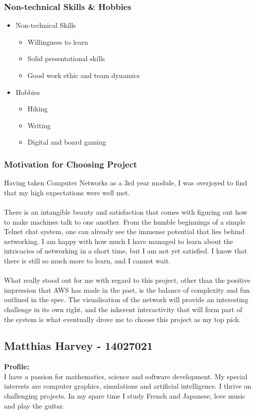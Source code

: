 \documentclass{article}
\begin{document}
	\subsubsection{Non-technical Skills \& Hobbies}
		\begin{itemize}
			\item Non-technical Skills
			\begin{itemize}
				\item Willingness to learn
				\item Solid presentational skills
				\item Good work ethic and team dynamics
			\end{itemize}
			\item Hobbies
			\begin{itemize}
				\item Hiking
				\item Writing
				\item Digital and board gaming
			\end{itemize}
		\end{itemize}
	\subsubsection{Motivation for Choosing Project}
	Having taken Computer Networks as a 3rd year module, I was overjoyed to find that my high 	expectations were well met. 
\\\\
	There is an intangible beauty and satisfaction that comes with figuring out how to make machines talk to one another. From the humble beginnings of a simple Telnet chat system, one can already see the immense potential that lies behind networking. I am happy with how much I have managed to learn about the intricacies of networking in a short time, but I am not yet satisfied. I know that there is still so much more to learn, and I cannot wait.
\\\\
What really stood out for me with regard to this project, other than the positive impression that AWS has made in the past, is the balance of complexity and fun outlined in the spec. The visualisation of the network will provide an interesting challenge in its own right, and the inherent interactivity that will form part of the system is what eventually drove me to choose this project as my top pick.  

	\cleardoublepage

	\subsection{Matthias Harvey - 14027021}
	\textbf{Profile:}\\
	I have a passion for mathematics, science and software development. My special interests are computer graphics, simulations and artificial intelligence. I thrive on challenging projects. In my spare time I study French and Japanese, love music and play the guitar.
\end{document}
